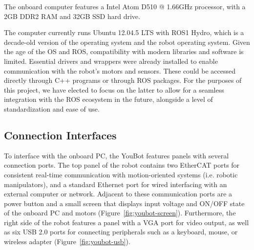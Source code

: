 \documentclass[a4paper, 12pt]{article}
\begin{document}
    The onboard computer features a Intel Atom D510 @ 1.66GHz processor, with a 2GB DDR2 RAM and 32GB SSD hard drive. 

    The computer currently runs Ubuntu 12.04.5 LTS with ROS1 Hydro, which is a decade-old version of the operating system and the robot operating system. Given the age of the OS and ROS, compatibility with modern libraries and software is limited. Essential drivers and wrappers were already installed to enable communication with the robot's motors and sensors. These could be accessed directly through C++ programs or through ROS packages. For the purposes of this project, we have elected to focus on the latter to allow for a seamless integration with the ROS ecosystem in the future, alongside a level of standardization and ease of use.

    \subsection{Connection Interfaces}

    To interface with the onboard PC, the YouBot features panels with several connection ports. The top panel of the robot contains two EtherCAT ports for consistent real-time communication with motion-oriented systems (i.e. robotic manipulators), and a standard Ethernet port for wired interfacing with an external computer or network. Adjacent to these communication ports are a power button and a small screen that displays input voltage and ON/OFF state of the onboard PC and motors (Figure~\ref{fig:youbot-screen}). Furthermore, the right side of the robot features a panel with a VGA port for video output, as well as six USB 2.0 ports for connecting peripherals such as a keyboard, mouse, or wireless adapter (Figure~\ref{fig:youbot-usb}). 
\end{document}
